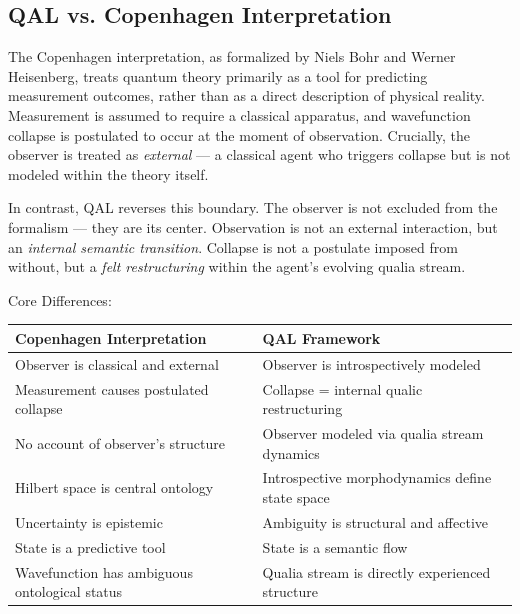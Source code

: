 \documentclass[11pt]{article}
\numberwithin{equation}{section} %
\begin{document}
\subsection{QAL vs. Copenhagen Interpretation}

The Copenhagen interpretation, as formalized by Niels Bohr and Werner Heisenberg, treats quantum theory primarily as a tool for predicting measurement outcomes, rather than as a direct description of physical reality. Measurement is assumed to require a classical apparatus, and wavefunction collapse is postulated to occur at the moment of observation. Crucially, the observer is treated as \textit{external} — a classical agent who triggers collapse but is not modeled within the theory itself.

In contrast, QAL reverses this boundary. The observer is not excluded from the formalism — they are its center. Observation is not an external interaction, but an \textit{internal semantic transition}. Collapse is not a postulate imposed from without, but a \textit{felt restructuring} within the agent’s evolving qualia stream.

\bigskip

\noindent Core Differences:

\begin{table}[H]
\centering
\renewcommand{\arraystretch}{1.3}
\begin{tabular}{|p{}|p{}|}
\hline
\textbf{Copenhagen Interpretation} & \textbf{QAL Framework} \\
\hline
Observer is classical and external & Observer is introspectively modeled \\
\hline
Measurement causes postulated collapse & Collapse = internal qualic restructuring \\
\hline
No account of observer's structure & Observer modeled via qualia stream dynamics \\
\hline
Hilbert space is central ontology & Introspective morphodynamics define state space \\
\hline
Uncertainty is epistemic & Ambiguity is structural and affective \\
\hline
State is a predictive tool & State is a semantic flow \\
\hline
Wavefunction has ambiguous ontological status & Qualia stream is directly experienced structure \\
\hline
\end{tabular}
\end{table}
\end{document}
